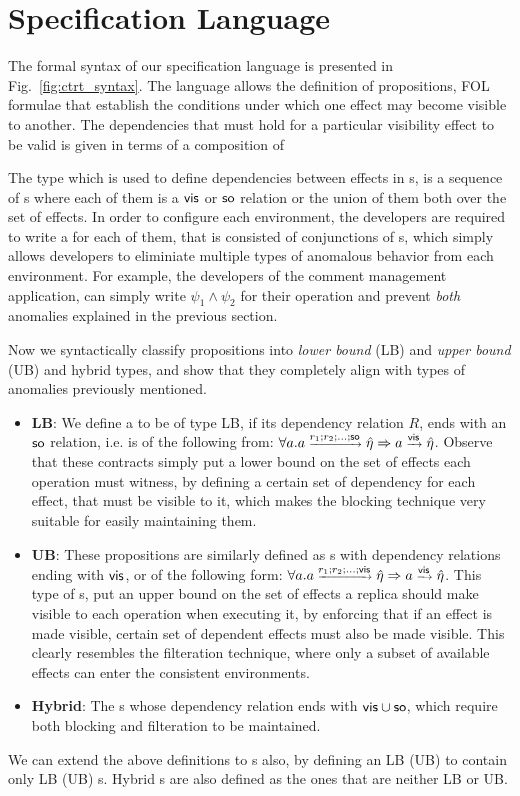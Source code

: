 \section {Specification Language} 
\label{sec:ctrt_language}


The formal syntax of our specification language is presented in
Fig.~\ref{fig:ctrt_syntax}.  The language allows the definition of
propositions, FOL formulae that establish the conditions under which
one effect may become visible to another.  The dependencies that must
hold for a particular visibility effect to be valid is given in
terms of a composition of 

The type \relationS{} which is used to define dependencies between
effects in \propS{}s, is a sequence of \seedS{}s where each of them is
a ${\normalfont \textsf{vis}}$ or ${\normalfont \textsf{so}}$ relation or the union of them both over the set of
effects. In order to configure each environment, the developers are
required to write a \specS{} for each of them, that is consisted of
conjunctions of \propS{}s, which simply allows developers to
eliminiate multiple types of anomalous behavior from each
environment. For example, the developers of the comment management
application, can simply write $\psi_1\wedge \psi_2$ for their \readC{}
operation and prevent \emph{both} anomalies explained in the previous
section.

Now we syntactically  classify propositions into \emph{lower bound} (LB) and
\emph{upper bound} (UB) and hybrid types, and show that they completely
align with types of
anomalies previously mentioned. 
\begin{itemize}
\item {\bf LB}: We define a \propS{} to be of type LB, 
if its dependency relation $R$, ends with an ${\normalfont \textsf{so}}$ relation, i.e. is of
the following from: $\scriptsize \forall a. a
\xrightarrow{r_1;r_2;...;{\normalfont \textsf{so}}} \hat{\eta}
\Rightarrow a \xrightarrow{{\normalfont \textsf{vis}}} \hat{\eta}$.
Observe that these contracts simply put a lower bound on the set of
effects each operation must witness, by defining a certain set of
dependency for each effect, that must be visible to it, which makes the
blocking technique very suitable for easily maintaining them.
\item {\bf UB}:  These propositions are similarly defined as \propS{}s
with dependency relations ending with ${\normalfont \textsf{vis}}$, or of the following form: 
$\scriptsize \forall a. a\xrightarrow{r_1;r_2;...;{\normalfont \textsf{vis}}} \hat{\eta}
\Rightarrow a \xrightarrow{{\normalfont \textsf{vis}}} \hat{\eta}$.
This type of \propS{}s, put an upper bound on the set of effects 
a replica should make visible to each operation when executing it, by
enforcing that if an effect is made visible, certain set of dependent
effects must also be made visible. This clearly resembles the
filteration technique, where only a subset of available effects can enter
the consistent environments.
\item {\bf Hybrid}: The \propS{}s whose dependency relation ends with
${\normalfont \textsf{vis}}\cup {\normalfont \textsf{so}}$, which require both blocking and filteration to be
maintained. 
\end{itemize}
We can extend the above definitions to \specS{}s also, by defining an LB
(UB) \specS{} to contain only LB (UB) \propS{}s. Hybrid \specS{}s are also
defined as the ones that are neither LB or UB.

